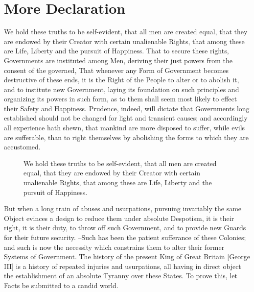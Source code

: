 \section{More Declaration}

We hold these truths to be self-evident, that all men are created equal,  that they are endowed by their Creator with certain unalienable Rights,  that among these are Life, Liberty and the pursuit of Happiness. That to secure these  rights, Governments are instituted among Men, deriving their just powers  from the consent of the governed, That whenever any Form of Government  becomes destructive of these ends, it is the Right of the People to alter  or to abolish it, and to institute new Government, laying its foundation on  such principles and organizing its powers in such form, as to them shall  seem most likely to effect their Safety and Happiness. Prudence, indeed, will dictate that Governments long established should not  be changed for light and transient causes; and accordingly all experience  hath shewn, that mankind are more disposed to suffer, while evils are  sufferable, than to right themselves by abolishing the forms to which they  are accustomed.
\begin{figure}[htb]
    \centering
    \caption{We hold these truths to be self-evident, that all men are created equal,  that they are endowed by their Creator with certain unalienable Rights,  that among these are Life, Liberty and the pursuit of Happiness.}
    \label{ChX-figure: FigureLabel3}
\end{figure}
But when a long train of abuses and usurpations, pursuing invariably the same  Object evinces a design to reduce them under absolute Despotism, it is their  right, it is their duty, to throw off such Government, and to provide new Guards for their future security. --Such has been the patient sufferance of these Colonies; and such is now the  necessity which constrains them to alter their former Systems of Government.  The history of the present King of Great Britain [George III] is a history  of repeated injuries and usurpations, all having in direct object the  establishment of an absolute Tyranny over these States. To prove this, let Facts be submitted to a candid world.